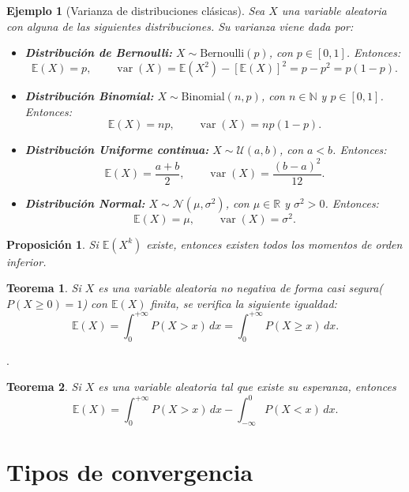 \documentclass{report}
\newtheorem{thm}{Teorema}[section]
\newtheorem{prop}{Proposición}[section]
\newtheorem{ej}{Ejemplo}[section]
\begin{document}
\begin{ej}[Varianza de distribuciones clásicas]
Sea \( X \) una variable aleatoria con alguna de las siguientes distribuciones. Su varianza viene dada por:

\begin{itemize}
    \item \textbf{Distribución de Bernoulli:} \( X \sim \mathrm{Bernoulli}(p) \), con \( p \in [0,1] \). Entonces:
    \[
    \mathbb{E}(X) = p, \qquad \operatorname{var}(X) = \mathbb{E}(X^2) - [\mathbb{E}(X)]^2 = p - p^2 = p(1 - p).
    \]

    \item \textbf{Distribución Binomial:} \( X \sim \mathrm{Binomial}(n, p) \), con \( n \in \mathbb{N} \) y \( p \in [0,1] \). Entonces:
    \[
    \mathbb{E}(X) = np, \qquad \operatorname{var}(X) = np(1 - p).
    \]

    \item \textbf{Distribución Uniforme continua:} \( X \sim \mathcal{U}(a, b) \), con \( a < b \). Entonces:
    \[
    \mathbb{E}(X) = \frac{a + b}{2}, \qquad \operatorname{var}(X) = \frac{(b - a)^2}{12}.
    \]

    \item \textbf{Distribución Normal:} \( X \sim \mathcal{N}(\mu, \sigma^2) \), con \( \mu \in \mathbb{R} \) y \( \sigma^2 > 0 \). Entonces:
    \[
    \mathbb{E}(X) = \mu, \qquad \operatorname{var}(X) = \sigma^2.
    \]
\end{itemize}
\end{ej}

\begin{prop}
Si \( \mathbb{E}(X^k) \) existe, entonces existen todos los momentos de orden inferior.
\end{prop}

\begin{thm}
Si \( X \) es una variable aleatoria no negativa de forma casi segura\footnotemark[1]  (\( P(X\geq0)=1 \)) 
con \( \mathbb{E}(X) \) finita, se verifica la siguiente igualdad:
\[
\mathbb{E}(X) = \int_0^{+\infty} P(X > x)\,dx = \int_0^{+\infty} P(X \geq x)\,dx.
\]
\end{thm}
.
\begin{thm}
Si \( X \) es una variable aleatoria tal que existe su esperanza, entonces
\[
\mathbb{E}(X) = \int_0^{+\infty} P(X > x)\, dx - \int_{-\infty}^0 P(X < x)\, dx.
\]
\end{thm}

\section{Tipos de convergencia}
\end{document}
